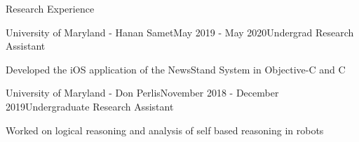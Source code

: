 \documentclass{resume} %
\begin{document}

\begin{rSection}{Research Experience}

\begin{rSubsection}{University of Maryland - Hanan Samet}{May 2019 - May 2020}{Undergrad Research Assistant}{}
\item Developed the iOS application of the NewsStand System in Objective-C and C
\end{rSubsection}

\begin{rSubsection}{University of Maryland - Don Perlis}{November 2018 - December 2019}{Undergraduate Research Assistant}{}
\item Worked on logical reasoning and analysis of self based reasoning in robots
\end{rSubsection}

\end{rSection}
\end{document}
